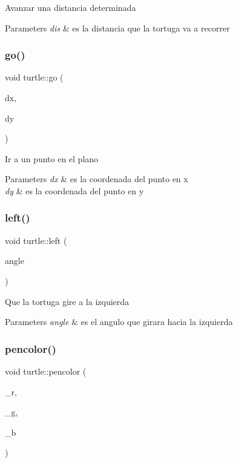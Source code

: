 Avanzar una distancia determinada 
\begin{DoxyParams}{Parameters}
{\em dis} & es la distancia que la tortuga va a recorrer \\
\hline
\end{DoxyParams}
\mbox{\label{classturtle_a8ff5abdc6c30e0d2781029c304ccc6d9}} 
\subsubsection{\texorpdfstring{go()}{go()}}
{\footnotesize\ttfamily void turtle\+::go (\begin{DoxyParamCaption}\item[{G\+Ldouble}]{dx,  }\item[{G\+Ldouble}]{dy }\end{DoxyParamCaption})}

Ir a un punto en el plano 
\begin{DoxyParams}{Parameters}
{\em dx} & es la coordenada del punto en x \\
\hline
{\em dy} & es la coordenada del punto en y \\
\hline
\end{DoxyParams}
\mbox{\label{classturtle_a52c30b7ecd387a2a4f7c7f5e5ae3cf53}} 
\subsubsection{\texorpdfstring{left()}{left()}}
{\footnotesize\ttfamily void turtle\+::left (\begin{DoxyParamCaption}\item[{G\+Ldouble}]{angle }\end{DoxyParamCaption})}

Que la tortuga gire a la izquierda 
\begin{DoxyParams}{Parameters}
{\em angle} & es el angulo que girara hacia la izquierda \\
\hline
\end{DoxyParams}
\mbox{\label{classturtle_a8f4ba1bb435b5a8a25fd381cd10120ff}} 
\subsubsection{\texorpdfstring{pencolor()}{pencolor()}}
{\footnotesize\ttfamily void turtle\+::pencolor (\begin{DoxyParamCaption}\item[{float}]{\+\_\+r,  }\item[{float}]{\+\_\+g,  }\item[{float}]{\+\_\+b }\end{DoxyParamCaption})}

